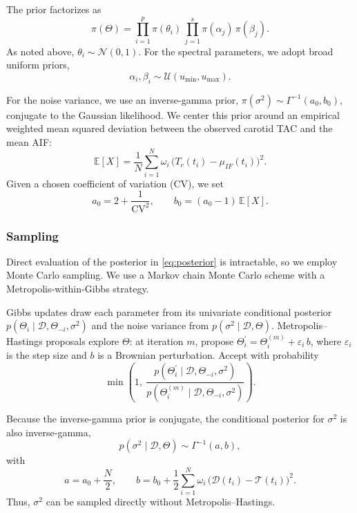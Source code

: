 The prior factorizes as
\begin{equation}
	\pi(\Theta) = \prod_{i=1}^p \pi(\theta_i)\,\prod_{j=1}^s \pi(\alpha_j)\,\pi(\beta_j).
\end{equation}
As noted above, \(\theta_i \sim \mathcal{N}(0,1)\).
For the spectral parameters, we adopt broad uniform priors,
\begin{equation}
	\alpha_i,\beta_i \sim \mathcal{U}( u_{\text{min}} , u_{\text{max}} ).
\end{equation}

For the noise variance, we use an inverse-gamma prior, \(\pi(\sigma^2) \sim \Gamma^{-1}(a_0,b_0)\), conjugate to the Gaussian likelihood.
We center this prior around an empirical weighted mean squared deviation between the observed carotid TAC and the mean AIF:
\begin{equation}
	\mathbb{E}[X] = \frac{1}{N} \sum_{i=1}^{N} \omega_i\,\bigl(T_c(t_i) - \mu_{IF}(t_i)\bigr)^2.
\end{equation}
Given a chosen coefficient of variation (CV), we set
\begin{equation}
	a_0 = 2 + \frac{1}{\mathrm{CV}^2}, \qquad b_0 = (a_0 - 1)\,\mathbb{E}[X].
\end{equation}

\subsubsection{Sampling}
Direct evaluation of the posterior in \eqref{eq:posterior} is intractable, so we employ Monte Carlo sampling. %
We use a Markov chain Monte Carlo scheme with a Metropolis-within-Gibbs strategy.

Gibbs updates draw each parameter from its univariate conditional posterior \(p(\Theta_i \mid \mathcal{D}, \Theta_{-i}, \sigma^2)\) and the noise variance from \(p(\sigma^2 \mid \mathcal{D},\Theta)\).
Metropolis–Hastings proposals explore \(\Theta\): at iteration \(m\), propose \(\Theta_{i}^\prime = \Theta_{i}^{(m)} + \varepsilon_{i}\,b\), where \(\varepsilon_i\) is the step size and \(b\) is a Brownian perturbation.
Accept with probability
\begin{equation}
	\min\!\left(1,\ \frac{p(\Theta_i^\prime \mid \mathcal{D}, \Theta_{-i}, \sigma^2)}{p(\Theta_i^{(m)} \mid \mathcal{D}, \Theta_{-i}, \sigma^2)}\right).
\end{equation}

Because the inverse-gamma prior is conjugate, the conditional posterior for \(\sigma^2\) is also inverse-gamma,
\begin{equation}
	p(\sigma^2 \mid \mathcal{D},\Theta) \sim \Gamma^{-1}(a, b),
\end{equation}
with
\begin{equation}
	a = a_0 + \frac{N}{2}, \qquad b = b_0 + \frac{1}{2}\sum_{i=1}^{N} \omega_i\,\bigl(\mathcal{D}(t_i) - \mathcal{T}(t_i)\bigr)^2.
\end{equation}
Thus, \(\sigma^2\) can be sampled directly without Metropolis–Hastings.

